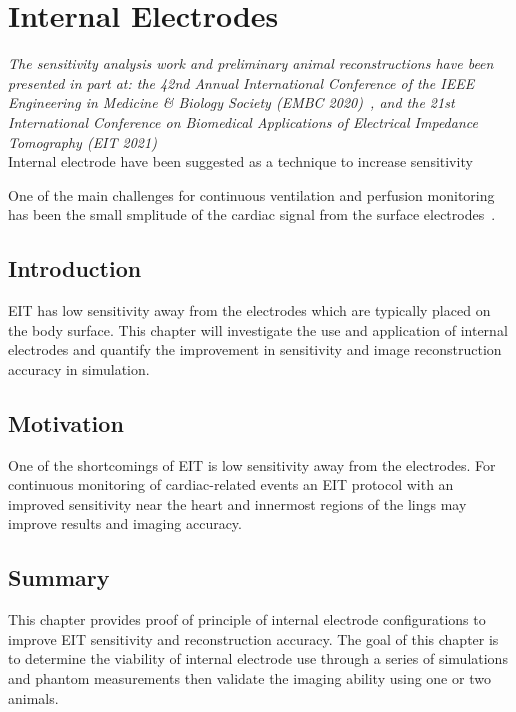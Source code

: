 \chapter{Internal Electrodes}
\emph{The sensitivity analysis work and preliminary animal reconstructions have
 been presented in part at: the 42nd Annual International Conference of the IEEE Engineering 
 in Medicine \& Biology Society (EMBC 2020)~\parencite{stowe_effect_2020}, and the 21st International Conference on Biomedical 
 Applications of Electrical Impedance Tomography (EIT 2021)~\parencite{stowe_using_2021}} \\

Internal electrode have been suggested as a technique to increase sensitivity 

One of the main challenges for continuous ventilation and perfusion monitoring has been
the small smplitude of the cardiac signal from the surface 
electrodes~\parencite{nguyen_review_2012}. %

\section{Introduction}
EIT has low sensitivity away from the electrodes which are typically placed on the body surface. 
This chapter will investigate the use and application of internal electrodes and quantify the improvement 
in sensitivity and image reconstruction accuracy in simulation.

\section{Motivation}
One of the shortcomings of EIT is low sensitivity away from the electrodes. 
For continuous monitoring of cardiac-related events an EIT protocol with an improved sensitivity 
near the heart and innermost regions of the lings may improve results and imaging accuracy.


\section{Summary}
This chapter provides proof of principle of internal electrode configurations to 
improve EIT sensitivity and reconstruction accuracy.
The goal of this chapter is to determine the viability of internal electrode use through a series of simulations and phantom measurements then validate
the imaging ability using one or two animals. 

